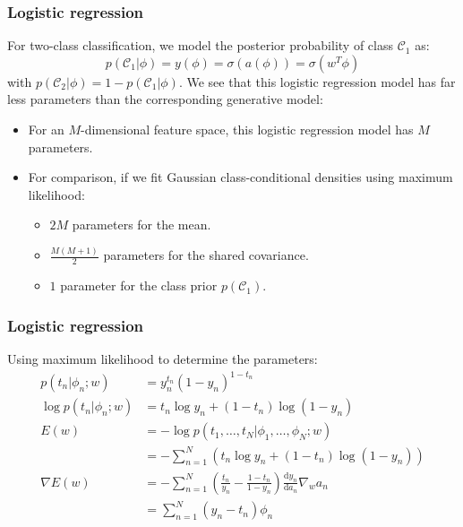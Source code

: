 \documentclass{beamer}
\begin{document}
\begin{frame}
    \frametitle{Logistic regression}
    For two-class classification, we model the posterior probability of class $\mathcal{C}_{1}$ as:
    \begin{equation*}
        p(\mathcal{C}_{1}|\phi)=y(\phi)=\sigma(a(\phi))=\sigma(w^{T}\phi)
    \end{equation*}
    with $p(\mathcal{C}_{2}|\phi)=1-p(\mathcal{C}_{1}|\phi)$. We see that this logistic regression model has far less parameters than the corresponding generative model:
    \begin{itemize}
        \item For an $M$-dimensional feature space, this logistic regression model has $M$ parameters.
        \item For comparison, if we fit Gaussian class-conditional densities using maximum likelihood:
        \begin{itemize}
            \item $2M$ parameters for the mean.
            \item $\frac{M(M+1)}{2}$ parameters for the shared covariance.
            \item $1$ parameter for the class prior $p(\mathcal{C}_{1})$.
        \end{itemize}
    \end{itemize}
\end{frame}

\begin{frame}
    \frametitle{Logistic regression}
    Using maximum likelihood to determine the parameters:
    \begin{align*}
        p(t_{n}|\phi_{n};w)&=y_{n}^{t_{n}}(1-y_{n})^{1-t_{n}} \\
        \log{}p(t_{n}|\phi_{n};w)&=t_{n}\log{}y_{n}+(1-t_{n})\log(1-y_{n}) \\
        E(w)&=-\log{}p(t_{1},\hdots,t_{N}|\phi_{1},\hdots,\phi_{N};w) \\
        &=-\sum_{n=1}^{N}(t_{n}\log{}y_{n}+(1-t_{n})\log(1-y_{n})) \\
        \nabla{}E(w)&=-\sum_{n=1}^{N}(\frac{t_{n}}{y_{n}}-\frac{1-t_{n}}{1-y_{n}})\frac{\mathrm{d}y_{n}}{\mathrm{d}a_{n}}\nabla_{w}a_{n} \\
        &=\sum_{n=1}^{N}(y_{n}-t_{n})\phi_{n}
    \end{align*}
\end{frame}
\end{document}
